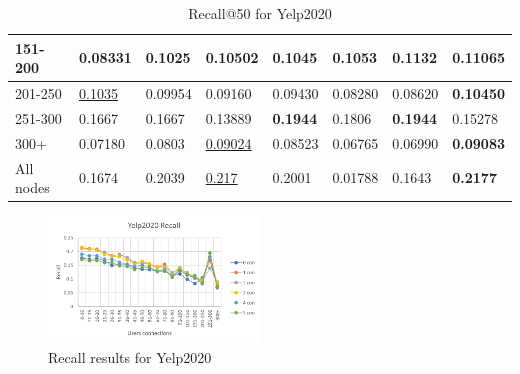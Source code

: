 \begin{table}[h!]
\begin{tabular}{|l|l|l|l|l|l|l||l|}
        151-200     & 0.08331                        & 0.1025                         & 0.10502                        & 0.1045                         & 0.1053                         & \textbf{0.1132}                 & 0.11065                    \\ \hline
        201-250     & \underline{0.1035}             & 0.09954                        & 0.09160                        & 0.09430                        & 0.08280                        & 0.08620                         & \textbf{0.10450}           \\ \hline
        251-300     & 0.1667                         & 0.1667                         & 0.13889                        & \textbf{0.1944}                & 0.1806                         & \textbf{0.1944}                 & 0.15278                    \\ \hline
        300+        & 0.07180                        & 0.0803                         & \underline{0.09024}            & 0.08523                        & 0.06765                        & 0.06990                         & \textbf{0.09083}           \\ \hline
        All nodes   & 0.1674                         & 0.2039                       & \underline{0.217}                          & 0.2001                         & 0.01788                        & 0.1643                          & \textbf{0.2177}            \\ \hline
    \end{tabular}
    \caption{Recall@50 for Yelp2020}
    \label{tab:yelp2020-recall-evaluation}
\end{table}

\begin{figure}[h!]
    \includegraphics[width=0.5\textwidth]{figures/evaluation/yelp-recall-evaluation.png}
    \centering
    \caption{Recall results for Yelp2020}
    \label{fig:recall-yelp2020-individual-embedding-evaluation}
\end{figure}

